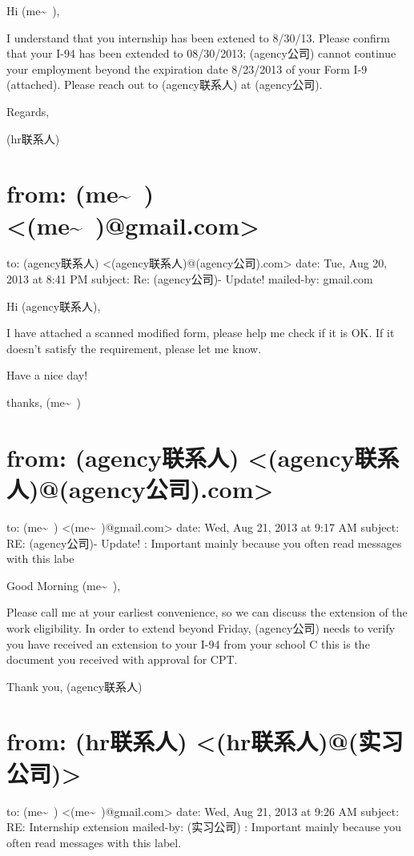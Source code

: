 \documentclass[12pt]{book}
\begin{document}
Hi (me\textasciitilde{}~),

I understand that you internship has been extened to 8/30/13.  Please confirm that your I-94 has been extended to 08/30/2013; (agency公司) cannot continue your employment beyond the expiration date 8/23/2013 of your Form I-9 (attached). Please reach out to (agency联系人) at (agency公司).

Regards,

(hr联系人)


\section{from:         (me\textasciitilde{}~) <(me\textasciitilde{}~)@gmail.com>}
\label{sec-35-5}
to:         (agency联系人) <(agency联系人)@(agency公司).com>
date:         Tue, Aug 20, 2013 at 8:41 PM
subject:         Re: (agency公司)- Update!
mailed-by:         gmail.com

Hi (agency联系人), 

I have attached a scanned modified form, please help me check if it is OK. If it doesn't satisfy the requirement, please let me know. 

Have a nice day!

thanks,
(me\textasciitilde{}~)


\section{from:         (agency联系人) <(agency联系人)@(agency公司).com>}
\label{sec-35-6}
to:         (me\textasciitilde{}~) <(me\textasciitilde{}~)@gmail.com>
date:         Wed, Aug 21, 2013 at 9:17 AM
subject:         RE: (agency公司)- Update!
:         Important mainly because you often read messages with this labe

Good Morning (me\textasciitilde{}~),

Please call me at your earliest convenience, so we can discuss the extension of the work eligibility. In order to extend beyond Friday, (agency公司) needs to verify you have received an extension to your I-94 from your school C this is the document you received with approval for CPT.

Thank you,
(agency联系人)


\section{from:         (hr联系人) <(hr联系人)@(实习公司)>}
\label{sec-35-7}
to:         (me\textasciitilde{}~) <(me\textasciitilde{}~)@gmail.com>
date:         Wed, Aug 21, 2013 at 9:26 AM
subject:         RE: Internship extension
mailed-by:         (实习公司)
:         Important mainly because you often read messages with this label.
\end{document}
